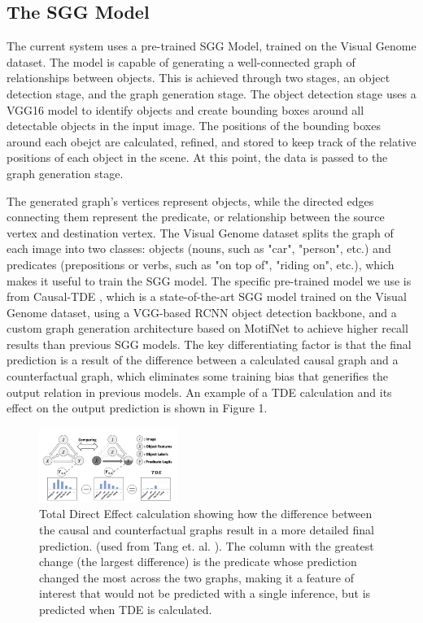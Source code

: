 \documentclass[letterpaper, 10 pt, conference]{ieeeconf}  %
\begin{document}
    \subsection*{The SGG Model}
        The current system uses a pre-trained SGG Model, trained on the Visual Genome dataset. The model is capable of generating a well-connected graph of relationships between objects. This is achieved through two stages, an object detection stage, and the graph generation stage. The object detection stage uses a VGG16 model to identify objects and create bounding boxes around all detectable objects in the input image. The positions of the bounding boxes around each obejct are calculated, refined, and stored to keep track of the relative positions of each object in the scene. At this point, the data is passed to the graph generation stage.
        
        The generated graph's vertices represent objects, while the directed edges connecting them represent the predicate, or relationship between the source vertex and destination vertex. The Visual Genome dataset splits the graph of each image into two classes: objects (nouns, such as "car", "person", etc.) and predicates (prepositions or verbs, such as "on top of", "riding on", etc.), which makes it useful to train the SGG model. The specific pre-trained model we use is from Causal-TDE \cite{tang2020sggcode}, which is a state-of-the-art SGG model trained on the Visual Genome dataset, using a VGG-based RCNN object detection backbone, and a custom graph generation architecture based on MotifNet to achieve higher recall results than previous SGG models. The key differentiating factor is that the final prediction is a result of the difference between a calculated causal graph and a counterfactual graph, which eliminates some training bias that generifies the output relation in previous models. An example of a TDE calculation and its effect on the output prediction is shown in Figure 1.

        \begin{figure}
            \centering
            \includegraphics[width=0.4\textwidth]{images/counterfactual.png}
            \caption{Total Direct Effect calculation showing how the difference between the causal and counterfactual graphs result in a more detailed final prediction. (used from Tang et. al. \cite{tang2020unbiased}). The column with the greatest change (the largest difference) is the predicate whose prediction changed the most across the two graphs, making it a feature of interest that would not be predicted with a single inference, but is predicted when TDE is calculated.}
            \label{fig:counterfactual}
        \end{figure}
\end{document}
